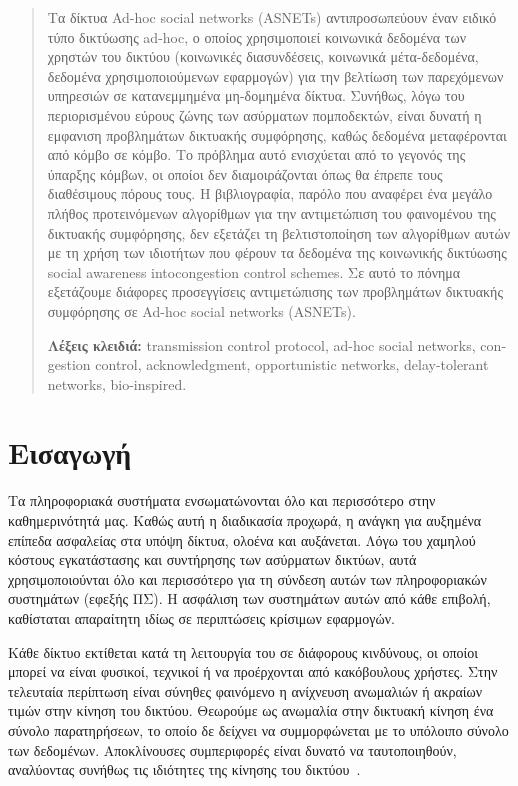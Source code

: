 \documentclass[12pt]{report}
\begin{document}
\begin{abstract}
Τα δίκτυα \textlatin{Ad-hoc social networks (ASNETs)} αντιπροσωπεύουν έναν ειδικό τύπο δικτύωσης \textlatin{ad-hoc}, ο οποίος χρησιμοποιεί κοινωνικά δεδομένα των χρηστών του δικτύου (κοινωνικές διασυνδέσεις, κοινωνικά μέτα-δεδομένα, δεδομένα χρησιμοποιούμενων εφαρμογών) για την βελτίωση των παρεχόμενων υπηρεσιών σε κατανεμμημένα μη-δομημένα δίκτυα. Συνήθως, λόγω του περιορισμένου εύρους ζώνης των ασύρματων πομποδεκτών, είναι δυνατή η εμφανιση προβλημάτων δικτυακής συμφόρησης, καθώς δεδομένα μεταφέρονται από κόμβο σε κόμβο. Το πρόβλημα αυτό ενισχύεται από το γεγονός της ύπαρξης κόμβων, οι οποίοι δεν διαμοιράζονται όπως θα έπρεπε τους διαθέσιμους πόρους τους. Η βιβλιογραφία, παρόλο που αναφέρει ένα μεγάλο πλήθος προτεινόμενων αλγορίθμων για την αντιμετώπιση του φαινομένου της δικτυακής συμφόρησης, δεν εξετάζει τη βελτιστοποίηση των αλγορίθμων αυτών με τη χρήση των ιδιοτήτων που φέρουν τα δεδομένα της κοινωνικής δικτύωσης \textlatin{social awareness  intocongestion control schemes}. Σε αυτό το πόνημα εξετάζουμε διάφορες προσεγγίσεις αντιμετώπισης των προβλημάτων δικτυακής συμφόρησης σε \textlatin{Ad-hoc social networks (ASNETs)}.

\vspace{10mm}

\noindent \textbf{Λέξεις κλειδιά:} \textlatin{transmission control protocol, ad-hoc social networks, congestion control, acknowledgment, opportunistic networks, delay-tolerant networks, bio-inspired}.
\end{abstract}

\hypersetup{pageanchor=true}
\clearpage
{}

\chapter{Εισαγωγή}
\hypersetup{pageanchor=true}
Τα πληροφοριακά συστήματα ενσωματώνονται όλο και περισσότερο στην καθημερινότητά μας. Καθώς αυτή η διαδικασία προχωρά, η ανάγκη για αυξημένα επίπεδα ασφαλείας στα υπόψη δίκτυα, ολοένα και αυξάνεται. Λόγω του χαμηλού κόστους εγκατάστασης και συντήρησης των ασύρματων δικτύων, αυτά χρησιμοποιούνται όλο και περισσότερο για τη σύνδεση αυτών των πληροφοριακών συστημάτων (εφεξής ΠΣ). Η ασφάλιση των συστημάτων αυτών από κάθε επιβολή, καθίσταται απαραίτητη ιδίως σε περιπτώσεις κρίσιμων εφαρμογών.

Κάθε δίκτυο εκτίθεται κατά τη λειτουργία του σε διάφορους κινδύνους, οι οποίοι μπορεί να είναι φυσικοί, τεχνικοί ή να προέρχονται από κακόβουλους χρήστες. Στην τελευταία περίπτωση είναι σύνηθες φαινόμενο η ανίχνευση ανωμαλιών ή ακραίων τιμών στην κίνηση του δικτύου. Θεωρούμε ως ανωμαλία στην δικτυακή κίνηση ένα σύνολο παρατηρήσεων, το οποίο δε δείχνει να συμμορφώνεται με το υπόλοιπο σύνολο των δεδομένων. Αποκλίνουσες συμπεριφορές είναι δυνατό να ταυτοποιηθούν, αναλύοντας συνήθως τις ιδιότητες της κίνησης του δικτύου~\cite{paper:05}.
\end{document}
